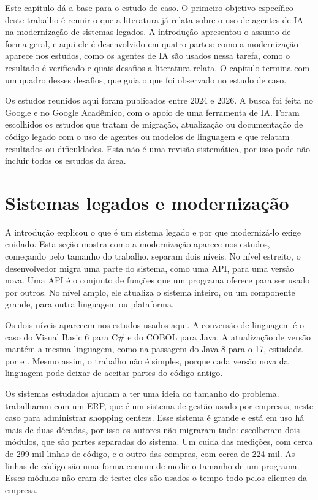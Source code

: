 Este capítulo dá a base para o estudo de caso. O primeiro objetivo específico deste trabalho é reunir o que a literatura já relata sobre o uso de agentes de IA na modernização de sistemas legados. A introdução apresentou o assunto de forma geral, e aqui ele é desenvolvido em quatro partes: como a modernização aparece nos estudos, como os agentes de IA são usados nessa tarefa, como o resultado é verificado e quais desafios a literatura relata. O capítulo termina com um quadro desses desafios, que guia o que foi observado no estudo de caso.

Os estudos reunidos aqui foram publicados entre 2024 e 2026. A busca foi feita no Google e no Google Acadêmico, com o apoio de uma ferramenta de IA. Foram escolhidos os estudos que tratam de migração, atualização ou documentação de código legado com o uso de agentes ou modelos de linguagem e que relatam resultados ou dificuldades. Esta não é uma revisão sistemática, por isso pode não incluir todos os estudos da área.

\section{Sistemas legados e modernização}

A introdução explicou o que é um sistema legado e por que modernizá-lo exige cuidado. Esta seção mostra como a modernização aparece nos estudos, começando pelo tamanho do trabalho.  separam dois níveis. No nível estreito, o desenvolvedor migra uma parte do sistema, como uma API, para uma versão nova. Uma API é o conjunto de funções que um programa oferece para ser usado por outros. No nível amplo, ele atualiza o sistema inteiro, ou um componente grande, para outra linguagem ou plataforma.

Os dois níveis aparecem nos estudos usados aqui. A conversão de linguagem é o caso do Visual Basic 6 para C\# e do COBOL para Java. A atualização de versão mantém a mesma linguagem, como na passagem do Java 8 para o 17, estudada por  e . Mesmo assim, o trabalho não é simples, porque cada versão nova da linguagem pode deixar de aceitar partes do código antigo.

Os sistemas estudados ajudam a ter uma ideia do tamanho do problema.  trabalharam com um ERP, que é um sistema de gestão usado por empresas, neste caso para administrar shopping centers. Esse sistema é grande e está em uso há mais de duas décadas, por isso os autores não migraram tudo: escolheram dois módulos, que são partes separadas do sistema. Um cuida das medições, com cerca de 299 mil linhas de código, e o outro das compras, com cerca de 224 mil. As linhas de código são uma forma comum de medir o tamanho de um programa. Esses módulos não eram de teste: eles são usados o tempo todo pelos clientes da empresa.

